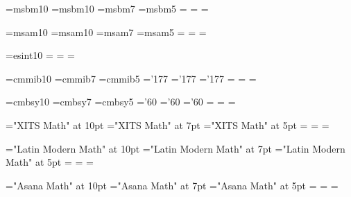 \newfam\cmmibfam
\newfam\cmbsyfam
\newfam\msbmfam
\newfam\msamfam
\newfam\esintfam
\newfam\lmmfam
\newfam\xitsfam
\newfam\asanafam

\def\bb{\fam\msbmfam\msbm}%
\font\msbm=msbm10
\font\tenmsbm=msbm10
\font\sevenmsbm=msbm7
\font\fivemsbm=msbm5
\textfont\msbmfam=\tenmsbm
\scriptfont\msbmfam=\sevenmsbm
\scriptscriptfont\msbmfam=\fivemsbm

\font\msam=msam10
\font\tenmsam=msam10
\font\sevenmsam=msam7
\font\fivemsam=msam5
\textfont\msamfam=\tenmsam
\scriptfont\msamfam=\sevenmsam
\scriptscriptfont\msamfam=\fivemsam

\font\esint=esint10
\textfont\esintfam=\esint
\scriptfont\esintfam=\esint
\scriptscriptfont\esintfam=\esint

\font\tencmmib=cmmib10
\font\sevencmmib=cmmib7
\font\fivecmmib=cmmib5
\skewchar\tencmmib='177
\skewchar\sevencmmib='177
\skewchar\fivecmmib='177
\textfont\cmmibfam=\tencmmib
\scriptfont\cmmibfam=\sevencmmib
\scriptscriptfont\cmmibfam=\fivecmmib

\font\tencmbsy=cmbsy10
\font\sevencmbsy=cmbsy7
\font\fivecmbsy=cmbsy5
\skewchar\tencmbsy='60
\skewchar\sevencmbsy='60
\skewchar\fivecmbsy='60
\textfont\cmbsyfam=\tencmbsy
\scriptfont\cmbsyfam=\sevencmbsy
\scriptscriptfont\cmbsyfam=\fivecmbsy

\ifdefined\XeTeXversion
\font\tenxits="XITS Math" at 10pt
\font\sevenxits="XITS Math" at 7pt
\font\fivexits="XITS Math" at 5pt
\textfont\xitsfam=\tenxits
\scriptfont\xitsfam=\sevenxits
\scriptscriptfont\xitsfam=\fivexits
\fi

\ifdefined\XeTeXversion
\font\tenlmm="Latin Modern Math" at 10pt
\font\sevenlmm="Latin Modern Math" at 7pt
\font\fivelmm="Latin Modern Math" at 5pt
\textfont\lmmfam=\tenlmm
\scriptfont\lmmfam=\sevenlmm
\scriptscriptfont\lmmfam=\fivelmm
\fi

\ifdefined\XeTeXversion
\font\tenasana="Asana Math" at 10pt
\font\sevenasana="Asana Math" at 7pt
\font\fiveasana="Asana Math" at 5pt
\textfont\asanafam=\tenasana
\scriptfont\asanafam=\sevenasana
\scriptscriptfont\asanafam=\fiveasana
\fi

\ifdefined\XeTeXversion
\def\iint{\XeTeXmathchar"1\lmmfam"222C\nolimits}%
\def\iiint{\XeTeXmathchar"1\lmmfam"222D\nolimits}%
\def\oint{\XeTeXmathchar"1\lmmfam"222E\nolimits}%
\def\oiint{\XeTeXmathchar"1\lmmfam"222F\nolimits}%
\def\oiiint{\XeTeXmathchar"1\lmmfam"2230\nolimits}%
\def\ointcw{\XeTeXmathchar"1\lmmfam"2232\nolimits}%
\def\ointccw{\XeTeXmathchar"1\lmmfam"2233\nolimits}%
\else
\def\iint{\mathchar\numexpr"1003 + "100 * \esintfam\relax\nolimits}%
\def\iiint{\mathchar\numexpr"1005 + "100 * \esintfam\relax\nolimits}%
\def\oint{\mathchar\numexpr"100B + "100 * \esintfam\relax\nolimits}%
\def\oiint{\mathchar\numexpr"100D + "100 * \esintfam\relax\nolimits}%
\def\ointcw{\mathchar\numexpr"1017 + "100 * \esintfam\relax\nolimits}%
\def\ointccw{\mathchar\numexpr"1019 + "100 * \esintfam\relax\nolimits}%
\fi

